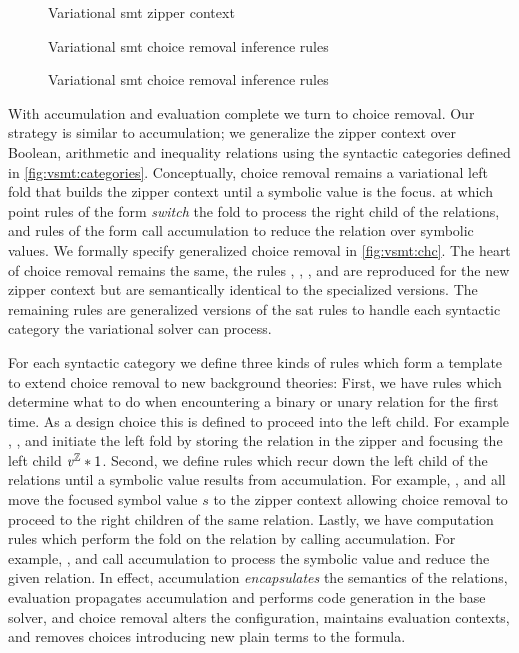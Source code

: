 \label{section:vsmt:choice-removal}
%
\begin{figure}
  
  \caption{Variational \ac{smt} zipper context}
  \label{fig:vsmt:zipper}
\end{figure}
%
\begin{figure}
  
  \caption{Variational \ac{smt} choice removal inference rules}%
  \label{fig:vsmt:chc}
\end{figure}
%
\begin{figure}
  \ContinuedFloat
  
  \caption{Variational \ac{smt} choice removal inference rules}
  \label{fig:vsmt:chc-cont}
\end{figure}
%
With accumulation and evaluation complete we turn to choice removal.
%
Our strategy is similar to accumulation; we generalize the zipper context over
Boolean, arithmetic and inequality relations using the syntactic categories
defined in \autoref{fig:vsmt:categories}.
%
Conceptually, choice removal remains a variational left fold that builds the
zipper context until a symbolic value is the focus. at which point rules of the
form  \emph{switch} the fold to process the right child of the
relations, and rules of the form  call accumulation to reduce the
relation over symbolic values. We formally specify generalized choice removal in
\autoref{fig:vsmt:chc}. The heart of choice removal remains the same, the rules
\crEval, \crChc, \crChcT, and \crChcF are reproduced for the new zipper context
\zipper but are semantically identical to the specialized versions. The
remaining rules are generalized versions of the \ac{sat} rules to handle each
syntactic category the variational solver can process.

For each syntactic category we define three kinds of rules which form a template
to extend choice removal to new background theories: First, we have rules which
determine what to do when encountering a binary or unary relation for the first
time. As a design choice this is defined to proceed into the left child. For
example \crNot{}, \crBool{}, and \crInEq{} initiate the left fold by storing the
relation in the zipper and focusing the left child $\mathit{v^{\mathbb{Z}}}*{1}$.
%
Second, we define rules which recur down the left child of the relations until a
symbolic value results from accumulation. For example, \crInEqL{}, \crBoolL{}
and \crArithL{} all move the focused symbol value $s$ to the zipper context
allowing choice removal to proceed to the right children of the same relation.
%
Lastly, we have computation rules which perform the fold on the relation by
calling accumulation. For example, \crUnaryIn, \crArithR and \crInEqR call
accumulation to process the symbolic value and reduce the given relation. In
effect, accumulation \emph{encapsulates} the semantics of the relations,
evaluation propagates accumulation and performs code generation in the base
solver, and choice removal alters the configuration, maintains evaluation
contexts, and removes choices introducing new plain terms to the formula.

